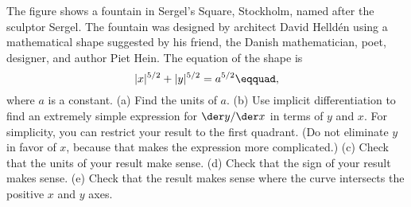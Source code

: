 The figure shows a fountain in Sergel's Square, Stockholm, named after
the sculptor Sergel. The fountain was designed by 
architect David Helld\'en using a mathematical shape suggested by his friend,
the Danish mathematician,
poet, designer, and author Piet Hein. The equation of the shape is
\begin{equation*}
  |x|^{5/2}+|y|^{5/2} = a^{5/2}\eqquad,
\end{equation*}
where $a$ is a constant.
(a) Find the units of $a$.
(b) Use implicit differentiation to find
an extremely simple expression for  $\der y/\der x$ in terms of $y$ and $x$.
For simplicity, you can restrict your result to the first quadrant.
(Do not eliminate $y$ in favor of $x$, because that makes the expression more complicated.)
(c) Check that the units of your result make sense.
(d) Check that the sign of your result makes sense.
(e) Check that the result makes sense where the curve intersects the positive
$x$ and $y$ axes.
